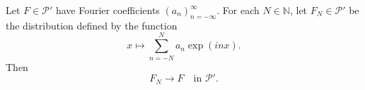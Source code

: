 Let $F \in \mathcal{P}'$ have Fourier coefficients $(a_n)_{n=-\infty}^{\infty}$.
For each $N \in \mathbb{N}$, let $F_N \in \mathcal{P}'$ be the distribution defined by the function
$$x \mapsto \sum_{n=-N}^{N} a_n \exp(inx).$$
Then
$$F_N \to F \quad \text{in } \mathcal{P}'.$$
